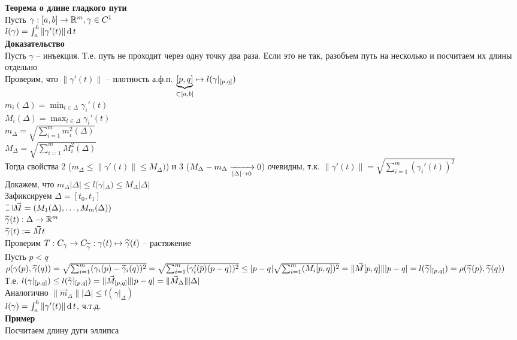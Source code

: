 \documentclass[12pt]{article}
\begin{document}
\textbf{Теорема о длине гладкого пути}\\
Пусть $\gamma: [a,b] \rto \Rset^m, \gamma \in C^1$\\
$l(\gamma) = \int_a^b \|\gamma'(t)\|\df t$\\
\textbf{Доказательство}\\
Пусть $\gamma$ -- инъекция. Т.е. путь не проходит через одну точку два раза. Если это не так, разобъем путь на несколько и посчитаем их длины отдельно\\
Проверим, что $\|\gamma'(t)\|$ -- плотность а.ф.п. $\ub{\subset [a,b]}{[p,q]} \mapsto l(\gamma|_{[p,q]})$\\
$m_i(\Delta) = \min_{t\in\Delta}\gamma_i'(t)$\\
$M_i(\Delta) = \max_{t\in\Delta}\gamma_i'(t)$\\
$m_\Delta = \sqrt{\sum_{i=1}^m m_i^2(\Delta)}$\\
$M_\Delta = \sqrt{\sum_{i=1}^m M_i^2(\Delta)}$\\
Тогда свойства 2 ($m_\Delta \leq \|\gamma'(t)\| \leq M_\Delta)$) и 3 ($M_\Delta - m_\Delta \xrto[|\Delta| \rto 0]{} 0$) очевидны, т.к. $\|\gamma'(t)\| = \sqrt{\sum_{i=1}^m (\gamma_i'(t))^2}$\\
Докажем, что $m_\Delta |\Delta| \leq l(\gamma|_\Delta) \leq M_\Delta |\Delta|$\\
Зафиксируем $\Delta = [t_0, t_1]$\\
$\letus \vec M = (M_1(\Delta), \ldots, M_m(\Delta))$\\
$\ot \gamma(t): \Delta \rto \Rset^m$\\
$\ot \gamma(t) := \vec M t$\\
Проверим $T: C_\gamma \rto C_{\ot \gamma}: \gamma(t) \mapsto \ot \gamma(t)$ -- растяжение\\
Пусть $p < q$\\
$\rho(\gamma(p), \ot \gamma(q)) = \sqrt{\sum_{i=1}^m (\gamma_i(p) - \ot\gamma_i(q))^2} = \sqrt{\sum_{i=1}^m (\gamma_i'(\ol p)(p-q))^2} \leq |p-q|\sqrt{\sum_{i=1}^m (M_i[p,q])^2} = \|\vec M[p,q]\||p-q| = l(\ot\gamma|_{[p,q]}) = \rho(\ot\gamma(p), \ot\gamma(q))$\\
Т.е. $l(\gamma|_{[p,q]}) \leq l(\ot\gamma|_{[p,q]}) = \|\vec M_{[p,q]}\||p-q| = \|\vec M_{\Delta}\||\Delta|$\\
Аналогично $\|\vec m_{\Delta}\||\Delta| \leq l(\gamma|_{\Delta})$\\
$l(\gamma) = \int_a^b \|\gamma'(t)\|\df t$, ч.т.д.\\
\textbf{Пример}\\
Посчитаем длину дуги эллипса\\
\end{document}
